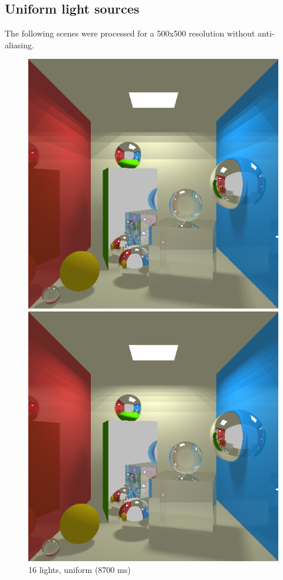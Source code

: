 \subsection{Uniform light sources}
The following scenes were processed for a 500x500 resolution without anti-aliasing.
\begin{figure}[H]
    \centering
    \includegraphics[width=\linewidth]{img/shadows/16.png}
    \caption{16 lights, uniform (8700 ms)}
\endminipage\hfill
{}
    \centering
    \includegraphics[width=\linewidth]{img/shadows/64.png}

\end{figure}
